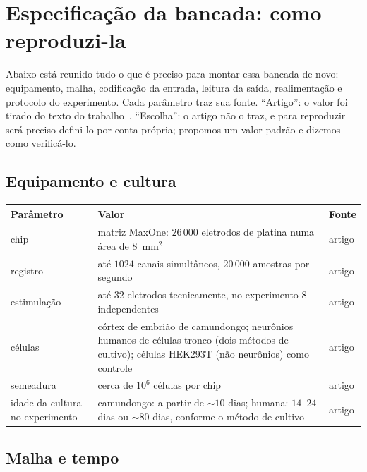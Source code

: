 \section{Especificação da bancada: como reproduzi-la}
\label{sec:dishspec}

Abaixo está reunido tudo o que é preciso para montar essa bancada de novo: equipamento, malha, codificação da entrada, leitura da saída, realimentação e protocolo do experimento. Cada parâmetro traz sua fonte. ``Artigo'': o valor foi tirado do texto do trabalho~\cite{Kagan2022}. ``Escolha'': o artigo não o traz, e para reproduzir será preciso defini-lo por conta própria; propomos um valor padrão e dizemos como verificá-lo.

\subsection*{Equipamento e cultura}

\begin{center}
\footnotesize
\setlength{\tabcolsep}{4pt}
\renewcommand{\arraystretch}{1.15}
\begin{tabular}{>{\raggedright}p{4.0cm}>{\raggedright}p{6.9cm}>{\raggedright\arraybackslash}p{1.6cm}}
\toprule
Parâmetro & Valor & Fonte \\
\midrule
chip & matriz MaxOne: $26\,000$ eletrodos de platina numa área de $8$~mm$^2$ & artigo \\
registro & até $1024$ canais simultâneos, $20\,000$ amostras por segundo & artigo \\
estimulação & até $32$ eletrodos tecnicamente, no experimento $8$ independentes & artigo \\
células & córtex de embrião de camundongo; neurônios humanos de células-tronco (dois métodos de cultivo); células HEK293T (não neurônios) como controle & artigo \\
semeadura & cerca de $10^6$ células por chip & artigo \\
idade da cultura no experimento & camundongo: a partir de $\sim10$ dias; humana: $14$--$24$ dias ou $\sim80$ dias, conforme o método de cultivo & artigo \\
\bottomrule
\end{tabular}
\end{center}

\subsection*{Malha e tempo}

